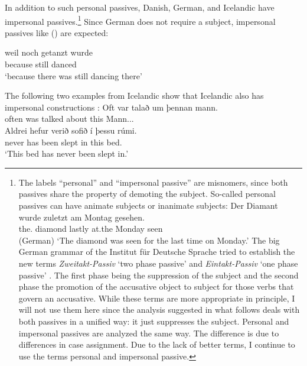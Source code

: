 In addition to such personal passives, Danish, German, and Icelandic have impersonal
passives.\footnote{
The labels ``personal'' and ``impersonal passive'' are misnomers, since both passives share the property of
demoting the subject. So-called personal passives can have animate subjects or inanimate subjects:
\ea 
\gll Der        Diamant wurde  zuletzt am Montag gesehen.\\
     the.\NOM{} diamond \AUX{} lastly at.the Monday seen\\\hfill(German)
\glt `The diamond was seen for the last time on Monday.'
\z
The big German grammar of the Institut für Deutsche Sprache tried to establish the new terms \emph{Zweitakt-Passiv} `two phase passive' and
\emph{Eintakt-Passiv} `one phase passive' \citep[]{Zifonun97b}. The first phase being the suppression of the subject and
the second phase the promotion of the accusative object to subject for those verbs that govern an
accusative. While these terms are more appropriate in principle, I will not use them here since the
analysis suggested in what follows deals with both passives in a unified way: it just suppresses the
subject. Personal and impersonal passives are analyzed the same way. The difference is due to
differences in case assignment. Due to the lack of better terms, I continue to use the terms personal and
impersonal passive.
} Since German does not require a subject, impersonal passives like () are expected:

\ea
\gll weil    noch  getanzt wurde\\
     because still danced  \AUX\\\german
\glt `because there was still dancing there'
\z

The following two examples from Icelandic show that Icelandic also has impersonal constructions \citep[]{Thrainsson2007a-u}:
\eal
\ex 
\gll Oft var   talað      um   þennan mann.\\
     often was talked about this Mann.\ACC.\SG.\M\\\icelandic
\ex
\gll Aldrei hefur verið    sofið      í  þessu  rúmi.\\
     never    has   been slept in this bed.\DAT\\
\glt `This bed has never been slept in.'
\zl

